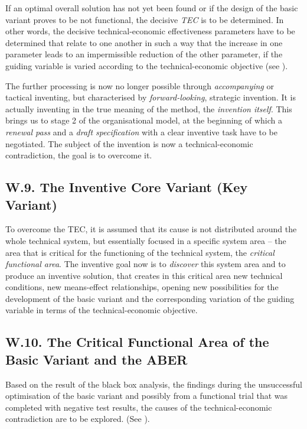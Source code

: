 \documentclass[11pt,a4paper]{article}
\begin{document}
If an optimal overall solution has not yet been found or if the design of the
basic variant proves to be not functional, the decisive \emph{TEC} is to be
determined.  In other words, the decisive technical-economic effectiveness
parameters have to be determined that relate to one another in such a way that
the increase in one parameter leads to an impermissible reduction of the other
parameter, if the guiding variable is varied according to the
technical-economic objective (see \cite[A.4]{RM-21}).

The further processing is now no longer possible through \emph{accompanying}
or tactical inventing, but characterised by \emph{forward-looking}, strategic
invention. It is actually inventing in the true meaning of the method, the
\emph{invention itself}. This brings us to stage 2 of the organisational
model, at the beginning of which a \emph{renewal pass} and a \emph{draft
  specification} with a clear inventive task have to be negotiated.  The
subject of the invention is now a technical-economic contradiction, the goal
is to overcome it.

\subsection*{W.9. The Inventive Core Variant (Key Variant)}

To overcome the TEC, it is assumed that its cause is not distributed around
the whole technical system, but essentially focused in a specific system area
-- the area that is critical for the functioning of the technical system, the
\emph{critical functional area}. The inventive goal now is to \emph{discover}
this system area and to produce an inventive solution, that creates in this
critical area new technical conditions, new means-effect relationships,
opening new possibilities for the development of the basic variant and the
corresponding variation of the guiding variable in terms of the
technical-economic objective.

\subsection*{W.10. The Critical Functional Area of the Basic Variant and
  the ABER}

Based on the result of the black box analysis, the findings during the
unsuccessful optimisation of the basic variant and possibly from a functional
trial that was completed with negative test results, the causes of the
technical-economic contradiction are to be explored. (See \cite[A.5]{RM-21}).
\end{document}
